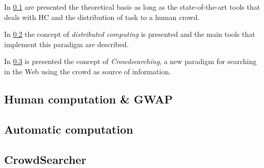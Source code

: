In \ref{sec:bg:crowd:human} are presented the theoretical basis as long as
the state-of-the-art tools that deals with \ac{HC} and the distribution of task
to a human crowd.

In \ref{sec:bg:crowd:auto} the concept of \emph{distributed computing} is
presented and the main tools that implement this paradigm are described.

In \ref{sec:bg:crowd:cs} is presented the concept of \emph{Crowdsearching},
a new paradigm for searching in the Web using the crowd as source of information.


\subsection{Human computation \& \acs{GWAP}}
\label{sec:bg:crowd:human}


\subsection{Automatic computation}
\label{sec:bg:crowd:auto}


\subsection{CrowdSearcher}
\label{sec:bg:crowd:cs}
